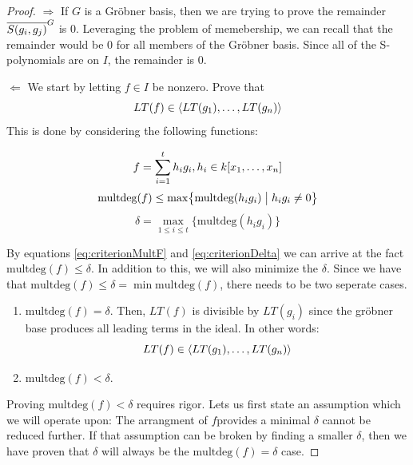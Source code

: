 \begin{proof}
    $\Rightarrow$ If $G$ is a Gröbner basis, then we are trying to prove the remainder $\overline{S(g_i, g_j)}^{G}$ is $0$. Leveraging the problem of memebership, we can recall that the remainder would be $0$ for all members of the Gröbner basis. Since all of the S-polynomials are on $I$, the remainder is $0$.

    $\Leftarrow$ We start by letting $f\in I$ be nonzero. Prove that \[LT(f) \in \langle LT(g_1), \dots, LT(g_n) \rangle\] This is done by considering the following functions:

    \begin{equation}
        f = \sum_{i=1}^t h_i g_i, h_i \in k\lbrack x_1, \dots, x_n \rbrack
        \label{eq:criterionf}
    \end{equation}  
    \begin{equation}
        \text{multdeg}(f) \leq \max \bigl\{ \text{multdeg}(h_i g_i) \bigm| h_i g_i \neq 0 \bigr\}
        \label{eq:criterionMultF}
    \end{equation}  
    \begin{equation}
        \delta = \max_{1\leq i \leq t} \bigl\{\text{multdeg}(h_i g_i)\bigr\}
        \label{eq:criterionDelta}
    \end{equation}        
    
    By equations \ref{eq:criterionMultF} and \ref{eq:criterionDelta} we can arrive at the fact $\text{multdeg}(f) \leq \delta$. In addition to this, we will also minimize the $\delta$.  Since we have that $\text{multdeg}(f) \leq \delta = \min  \text{multdeg}(f)$, there needs to be two seperate cases.

    \begin{enumerate}
        \item $\text{multdeg}(f) = \delta$. Then, $LT(f)$ is divisible by $LT(g_i)$ since the gröbner base produces all leading terms in the ideal. In other words:
        \[
            LT(f) \in \langle LT(g_1), \dots, LT(g_n) \rangle
        \]

       \item $\text{multdeg}(f) < \delta$.
    \end{enumerate}

    Proving $\text{multdeg}(f) < \delta$ requires rigor. Lets us first state an assumption which we will operate upon: The arrangment of $f $provides a minimal $\delta$ cannot be reduced further. If that assumption can be broken by finding a smaller $\delta$, then we have proven that $\delta$ will always be the $\text{multdeg}(f) = \delta$ case.


\end{proof}
